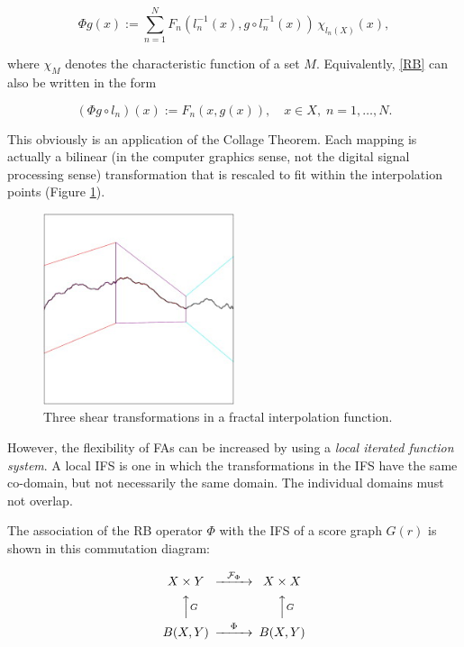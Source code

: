 \documentclass[english,11pt,letterpaper,onecolumn]{scrartcl}
\numberwithin{equation}{section}
\newcommand{\cF}{\mathcal{F}}
\newcommand{\be}{\begin{equation}}
\newcommand{\ee}{\end{equation}}
\begin{document}
\be\label{RB}
\Phi g (x) := \sum\limits_{n=1}^N F_n (l_n^{-1} (x), g\circ l_n^{-1}
(x))\,\chi_{l_n(X)}(x),
\ee

\noindent where $\chi_M$ denotes the characteristic function of a set $M$.
Equivalently, \eqref{RB} can also be written in the form

\be\label{3.3}
(\Phi g \circ l_n) (x) := F_n (x, g(x)),\quad x\in X, \;n = 1, \ldots, N.
\ee


This obviously is an application of the Collage Theorem. Each mapping is
actually a bilinear (in the computer graphics sense, not the digital signal
processing sense) transformation that is rescaled to fit within the
interpolation points (Figure \ref{fig:fif}).

\begin{figure}
\centerline{\includegraphics[width = 0.5\textwidth]{interp}}
\caption{\label{fig:fif} Three shear transformations in
a fractal interpolation function.\protect\footnotemark}
\end{figure}


However, the flexibility of FAs can be increased by using a
\textit{local iterated function system}. A local IFS is one in which the
transformations in the IFS have the same co-domain, but not necessarily the
same domain. The individual domains must not overlap.

The association of the RB operator $\Phi$ with the IFS of a score graph $G(r)$ is
shown in this commutation diagram:

\be
\begin{CD}
X\times Y @>\cF_\Phi>> X\times X\\
@AAGA                  @AAGA\\
B(X,Y) @>\Phi>>  B(X,Y)
\end{CD}
\ee
\end{document}
